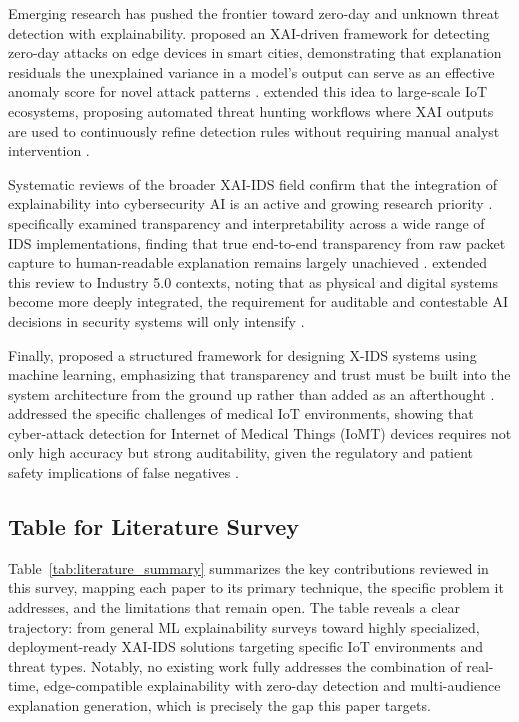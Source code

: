 \documentclass[a4paper,fleqn]{cas-dc}
\numberwithin{equation}{section}
\begin{document}
Emerging research has pushed the frontier toward zero-day and unknown threat detection with explainability. \citeauthor{aspg2025zeroday} proposed an XAI-driven framework for detecting zero-day attacks on edge devices in smart cities, demonstrating that explanation residuals the unexplained variance in a model's output can serve as an effective anomaly score for novel attack patterns \cite{aspg2025zeroday}. \citeauthor{ijcrt2025threat} extended this idea to large-scale IoT ecosystems, proposing automated threat hunting workflows where XAI outputs are used to continuously refine detection rules without requiring manual analyst intervention \cite{ijcrt2025threat}.

Systematic reviews of the broader XAI-IDS field confirm that the integration of explainability into cybersecurity AI is an active and growing research priority \cite{frontiers2025ids, mdpi2025industry5}. \citeauthor{frontiers2025ids} specifically examined transparency and interpretability across a wide range of IDS implementations, finding that true end-to-end transparency from raw packet capture to human-readable explanation remains largely unachieved \cite{frontiers2025ids}. \citeauthor{mdpi2025industry5} extended this review to Industry 5.0 contexts, noting that as physical and digital systems become more deeply integrated, the requirement for auditable and contestable AI decisions in security systems will only intensify \cite{mdpi2025industry5}.

Finally, \citeauthor{anthony2025designing} proposed a structured framework for designing X-IDS systems using machine learning, emphasizing that transparency and trust must be built into the system architecture from the ground up rather than added as an afterthought \cite{anthony2025designing}. \citeauthor{judith2023efficient} addressed the specific challenges of medical IoT environments, showing that cyber-attack detection for Internet of Medical Things (IoMT) devices requires not only high accuracy but strong auditability, given the regulatory and patient safety implications of false negatives \cite{judith2023efficient}.

\subsection{Table for Literature Survey}

Table~\ref{tab:literature_summary} summarizes the key contributions reviewed in this survey, mapping each paper to its primary technique, the specific problem it addresses, and the limitations that remain open. The table reveals a clear trajectory: from general ML explainability surveys toward highly specialized, deployment-ready XAI-IDS solutions targeting specific IoT environments and threat types. Notably, no existing work fully addresses the combination of real-time, edge-compatible explainability with zero-day detection and multi-audience explanation generation, which is precisely the gap this paper targets.
\end{document}
